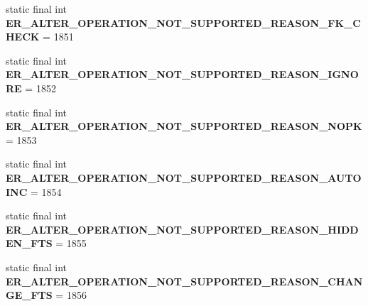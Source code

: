 \begin{DoxyCompactItemize}
\item 
\mbox{\label{classcom_1_1mysql_1_1cj_1_1exceptions_1_1_mysql_error_numbers_a50bee292a58d06820b52b0182c7c9166}} 
static final int {\bfseries E\+R\+\_\+\+A\+L\+T\+E\+R\+\_\+\+O\+P\+E\+R\+A\+T\+I\+O\+N\+\_\+\+N\+O\+T\+\_\+\+S\+U\+P\+P\+O\+R\+T\+E\+D\+\_\+\+R\+E\+A\+S\+O\+N\+\_\+\+F\+K\+\_\+\+C\+H\+E\+CK} = 1851
\item 
\mbox{\label{classcom_1_1mysql_1_1cj_1_1exceptions_1_1_mysql_error_numbers_a01b68f181b13d4b4e52c6ef0fa73a61f}} 
static final int {\bfseries E\+R\+\_\+\+A\+L\+T\+E\+R\+\_\+\+O\+P\+E\+R\+A\+T\+I\+O\+N\+\_\+\+N\+O\+T\+\_\+\+S\+U\+P\+P\+O\+R\+T\+E\+D\+\_\+\+R\+E\+A\+S\+O\+N\+\_\+\+I\+G\+N\+O\+RE} = 1852
\item 
\mbox{\label{classcom_1_1mysql_1_1cj_1_1exceptions_1_1_mysql_error_numbers_a7e72a43f08b0533dd547149fa1acacdf}} 
static final int {\bfseries E\+R\+\_\+\+A\+L\+T\+E\+R\+\_\+\+O\+P\+E\+R\+A\+T\+I\+O\+N\+\_\+\+N\+O\+T\+\_\+\+S\+U\+P\+P\+O\+R\+T\+E\+D\+\_\+\+R\+E\+A\+S\+O\+N\+\_\+\+N\+O\+PK} = 1853
\item 
\mbox{\label{classcom_1_1mysql_1_1cj_1_1exceptions_1_1_mysql_error_numbers_a53945ac4513809c87a6df13a4e198b6a}} 
static final int {\bfseries E\+R\+\_\+\+A\+L\+T\+E\+R\+\_\+\+O\+P\+E\+R\+A\+T\+I\+O\+N\+\_\+\+N\+O\+T\+\_\+\+S\+U\+P\+P\+O\+R\+T\+E\+D\+\_\+\+R\+E\+A\+S\+O\+N\+\_\+\+A\+U\+T\+O\+I\+NC} = 1854
\item 
\mbox{\label{classcom_1_1mysql_1_1cj_1_1exceptions_1_1_mysql_error_numbers_a3583dccddef611fcfe1cd88295d4fed9}} 
static final int {\bfseries E\+R\+\_\+\+A\+L\+T\+E\+R\+\_\+\+O\+P\+E\+R\+A\+T\+I\+O\+N\+\_\+\+N\+O\+T\+\_\+\+S\+U\+P\+P\+O\+R\+T\+E\+D\+\_\+\+R\+E\+A\+S\+O\+N\+\_\+\+H\+I\+D\+D\+E\+N\+\_\+\+F\+TS} = 1855
\item 
\mbox{\label{classcom_1_1mysql_1_1cj_1_1exceptions_1_1_mysql_error_numbers_a61570eb6355aa839f760a5fa1280c097}} 
static final int {\bfseries E\+R\+\_\+\+A\+L\+T\+E\+R\+\_\+\+O\+P\+E\+R\+A\+T\+I\+O\+N\+\_\+\+N\+O\+T\+\_\+\+S\+U\+P\+P\+O\+R\+T\+E\+D\+\_\+\+R\+E\+A\+S\+O\+N\+\_\+\+C\+H\+A\+N\+G\+E\+\_\+\+F\+TS} = 1856

\end{DoxyCompactItemize}
